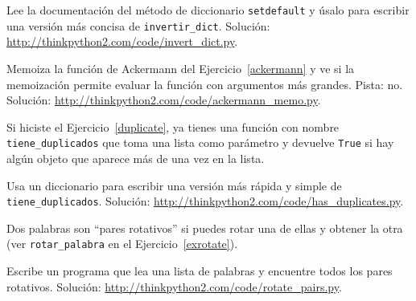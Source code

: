 \documentclass[10pt]{book}
\begin{document}
\begin{exercise}
\label{setdefault}

Lee la documentación del método de diccionario {\tt setdefault}
y úsalo para escribir una versión más concisa de \verb"invertir_dict".
Solución: \url{http://thinkpython2.com/code/invert_dict.py}.

\end{exercise}


\begin{exercise}
Memoiza la función de Ackermann del Ejercicio~\ref{ackermann} y ve si
la memoización permite evaluar la función con argumentos
más grandes.  Pista: no.
Solución: \url{http://thinkpython2.com/code/ackermann_memo.py}.

\end{exercise}



\begin{exercise}

Si hiciste el Ejercicio~\ref{duplicate}, ya tienes
una función con nombre \verb"tiene_duplicados" que toma una lista
como parámetro y devuelve {\tt True} si hay algún objeto
que aparece más de una vez en la lista.

Usa un diccionario para escribir una versión más rápida y simple de
\verb"tiene_duplicados".
Solución: \url{http://thinkpython2.com/code/has_duplicates.py}.

\end{exercise}


\begin{exercise}
\label{exrotatepairs}

Dos palabras son ``pares rotativos'' si puedes rotar una de ellas
y obtener la otra (ver \verb"rotar_palabra" en el Ejercicio~\ref{exrotate}).

Escribe un programa que lea una lista de palabras y encuentre todos los pares
rotativos.  Solución: \url{http://thinkpython2.com/code/rotate_pairs.py}.

\end{exercise}
\end{document}
